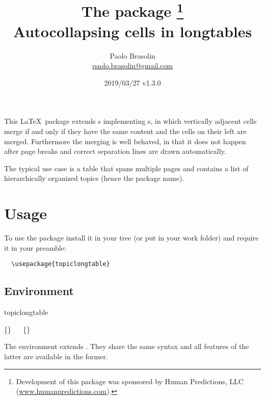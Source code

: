 \documentclass[full,kernel]{l3doc}
\begin{document}
\title{%
  The  package%
  \thanks{Development of this package was sponsored by Human Predictions,
    LLC (\href{http://www.humanpredictions.com}{www.humanpredictions.com}).}\\
  Autocollapsing cells in longtables
}

\author{
  Paolo Brasolin\\
  \href{mailto:paolo.brasolin@gmail.com}{paolo.brasolin@gmail.com}
}

\date{2019/03/27 v1.3.0}

\maketitle

\begin{documentation}


This \LaTeX\ package extends s implementing
s, in which vertically adjacent cells merge if
and only if they have the same content and the cells on their left
are merged.  Furthermore the merging is well behaved, in that it
does not happen after page breaks and correct separation lines are
drawn automatically.

The typical use case is a table that spans multiple pages and
contains a list of hierarchically organized topics (hence the package
name).




\section*{Usage}

To use the package install it in your tree (or put  in your work folder) and require it in your preamble:

\begin{verbatim}
  \usepackage{topiclongtable}
\end{verbatim}




\subsection*{Environment}

\begin{function}[updated=2019-03-27]{topiclongtable}
  \begin{syntax}
    \{\}
    \ \ 
    \{\}
  \end{syntax}
  The  environment extends .
  They share the same syntax and all features of the latter are
  available in the former.


\end{function}
\end{documentation}
\end{document}

